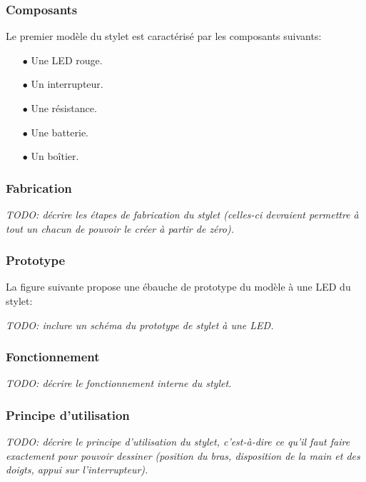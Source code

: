 \documentclass[11pt,a4paper,oldfontcommands]{memoir}
\begin{document}
\subsubsection{Composants}

Le premier modèle du stylet est caractérisé par les composants suivants:

\begin{itemize}
\item[$\bullet$] Une LED rouge.
\item[$\bullet$] Un interrupteur.
\item[$\bullet$] Une résistance.
\item[$\bullet$] Une batterie.
\item[$\bullet$] Un boîtier.
\end{itemize}

\subsubsection{Fabrication}

\textit{TODO: décrire les étapes de fabrication du stylet (celles-ci devraient permettre à tout un chacun de pouvoir le créer à partir de zéro).}

\subsubsection{Prototype}

La figure suivante propose une ébauche de prototype du modèle à une LED du stylet:

\textit{TODO: inclure un schéma du prototype de stylet à une LED.}

\subsubsection{Fonctionnement}

\textit{TODO: décrire le fonctionnement interne du stylet.}

\subsubsection{Principe d'utilisation}

\textit{TODO: décrire le principe d'utilisation du stylet, c'est-à-dire ce qu'il faut faire exactement pour pouvoir dessiner (position du bras, disposition de la main et des doigts, appui sur l'interrupteur).}

\newpage
\end{document}
